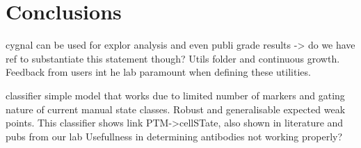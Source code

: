 


\section{Conclusions}

cygnal can be used for explor analysis and even publi grade results -> do we have ref to substantiate this statement though?
Utils folder and continuous growth. Feedback from users int he lab paramount when defining these utilities.

classifier simple model that works due to limited number of markers and gating nature of current manual state classes. Robust and generalisable expected weak points.
This classifier shows link PTM->cellSTate, also shown in literature and pubs from our lab
Usefullness in determining antibodies not working properly?